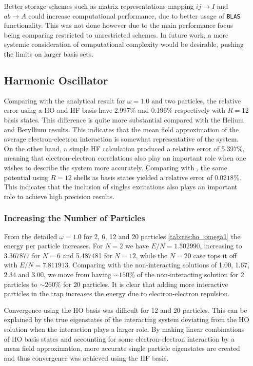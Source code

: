 Better storage schemes such as matrix representations mapping $ij \rightarrow I$ and $ab \rightarrow A$ could increase computational performance, due to better usage of \verb|BLAS| functionality. This was not done however due to the main performance focus being comparing restricted to unrestricted schemes. In future work, a more systemic consideration of computational complexity would be desirable, pushing the limits on larger basis sets.



\subsection{Harmonic Oscillator}
Comparing with the analytical result for $\omega = 1.0$ and two particles, the relative error using a HO and HF basis have 2.997\% and 0.196\% respectively with $R=12$ basis states. This difference is quite more substantial compared with the Helium and Beryllium results. This indicates that the mean field approximation of the average electron-electron interaction is somewhat representative of the system. On the other hand, a simple HF calculation produced a relative error of 5.397\%, meaning that electron-electron correlations also play an important role when one wishes to describe the system more accurately. Comparing with \citep{pedersenlohneInitioComputationEnergies2011}, the same potential using $R=12$ shells as basis states yielded a relative error of $0.0218\%$. This indicates that the inclusion of singles excitations also plays an important role to achieve high precision results.
\subsubsection{Increasing the Number of Particles}
From the detailed $\omega = 1.0$ for 2, 6, 12 and 20 particles \cref{tab:res:ho_omega1} the energy per particle increases. For $N=2$ we have $E/N = 1.502990$, increasing to 3.367877 for $N=6$ and 5.487481 for $N=12$, while the $N = 20$ case tops it off with $E/N=7.811913$. Comparing with the non-interacting solutions of 1.00, 1.67, 2.34 and 3.00, we move from having $\sim 150\%$ of the non-interacting solution for 2 particles to $\sim 260\%$ for 20 particles. It is clear that adding more interactive particles in the trap increases the energy due to electron-electron repulsion.

Convergence using the HO basis was difficult for 12 and 20 particles. This can be explained by the true eigenstates of the interacting system deviating from the HO solution when the interaction plays a larger role. By making linear combinations of HO basis states and accounting for some electron-electron interaction by a mean field approximation, more accurate single particle eigenstates are created and thus convergence was achieved using the HF basis.

